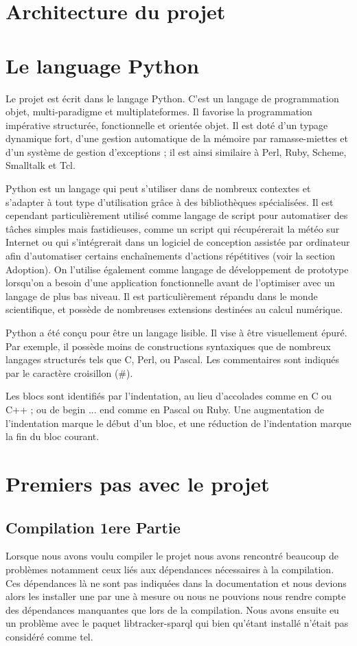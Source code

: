 \documentclass[12pt]{report}
\begin{document}
\section{Architecture du projet}

\section{Le language Python}
Le projet est écrit dans le langage Python. C'est un langage de
programmation objet, multi-paradigme et multiplateformes. Il favorise la
programmation impérative structurée, fonctionnelle et orientée objet. 
Il est doté d'un typage dynamique fort, d'une gestion automatique de la 
mémoire par ramasse-miettes et d'un système de gestion d'exceptions ; 
il est ainsi similaire à Perl, Ruby, Scheme, Smalltalk et Tcl.

Python est un langage qui peut s'utiliser dans de nombreux contextes 
et s'adapter à tout type d'utilisation grâce à des bibliothèques 
spécialisées. Il est cependant particulièrement utilisé comme 
langage de script pour automatiser des tâches simples mais 
fastidieuses, comme un script qui récupérerait la météo sur Internet 
ou qui s'intégrerait dans un logiciel de conception assistée par 
ordinateur afin d'automatiser certains enchaînements d'actions 
répétitives (voir la section Adoption). On l'utilise également comme 
langage de développement de prototype lorsqu'on a besoin d'une 
application fonctionnelle avant de l'optimiser avec un langage 
de plus bas niveau. Il est particulièrement répandu dans le monde 
scientifique, et possède de nombreuses extensions destinées au 
calcul numérique.

Python a été conçu pour être un langage lisible. Il vise à être 
visuellement épuré. Par exemple, il possède moins de constructions 
syntaxiques que de nombreux langages structurés tels que C, 
Perl, ou Pascal. Les commentaires sont indiqués par le caractère 
croisillon (#).

Les blocs sont identifiés par l'indentation, au lieu d'accolades 
comme en C ou C++ ; ou de begin ... end comme en Pascal ou Ruby. 
Une augmentation de l'indentation marque le début d'un bloc, et 
une réduction de l'indentation marque la fin du bloc courant. 

\section{Premiers pas avec le projet}
\subsection{Compilation 1ere Partie}
Lorsque nous avons voulu compiler le projet nous avons rencontré 
beaucoup de problèmes notamment ceux liés aux dépendances nécessaires
à la compilation. Ces dépendances là ne sont pas indiquées dans la
documentation et nous devions alors les installer une par une à
mesure ou nous ne pouvions nous rendre compte des dépendances 
manquantes que lors de la compilation. 
Nous avons ensuite eu un problème avec le paquet libtracker-sparql
qui bien qu'étant installé n’était pas considéré comme tel.
\end{document}
